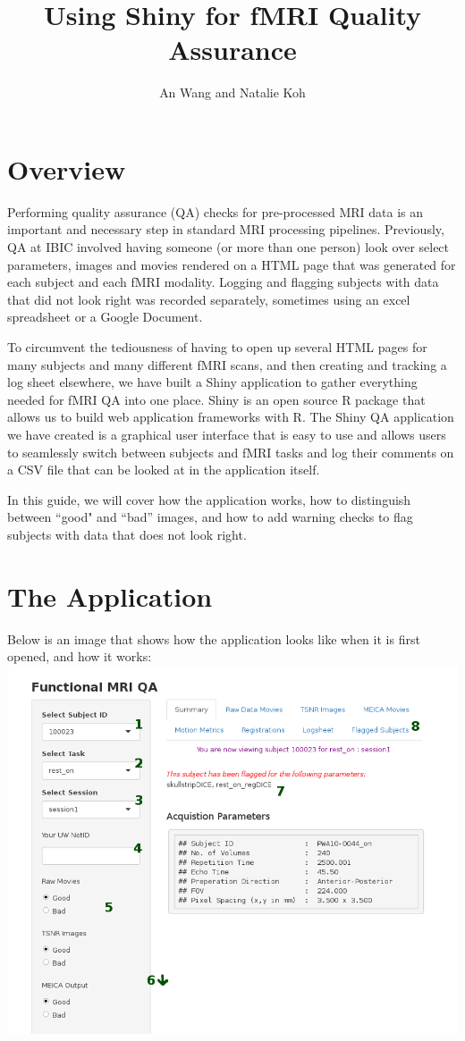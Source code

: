 \documentclass[12pt]{article}
\title{Using Shiny for fMRI Quality Assurance}
\author{An Wang and Natalie Koh}
\begin{document}
	
	\maketitle

\section{Overview}

Performing quality assurance (QA) checks for pre-processed MRI data is an important and necessary step in standard MRI processing pipelines. Previously, QA at IBIC involved having someone (or more than one person) look over select parameters, images and movies rendered on a HTML page that was generated for each subject and each fMRI modality. Logging and flagging subjects with data that did not look right was recorded separately, sometimes using an excel spreadsheet or a Google Document. 

To circumvent the tediousness of having to open up several HTML pages for many subjects and many different fMRI scans, and then creating and tracking a log sheet elsewhere, we have built a Shiny application to gather everything needed for fMRI QA into one place. Shiny is an open source R package that allows us to build web application frameworks with R. The Shiny QA application we have created is a graphical user interface that is easy to use and allows users to seamlessly switch between subjects and fMRI tasks and log their comments on a CSV file that can be looked at in the application itself.

In this guide, we will cover how the application works, how to distinguish between ``good" and ``bad'' images, and how to add warning checks to flag subjects with data that does not look right.

\section{The Application}

Below is an image that shows how the application looks like when it is first opened, and how it works: 
\newline
\includegraphics[scale=0.5]{shiny_summary_numbered.png}
\end{document}
